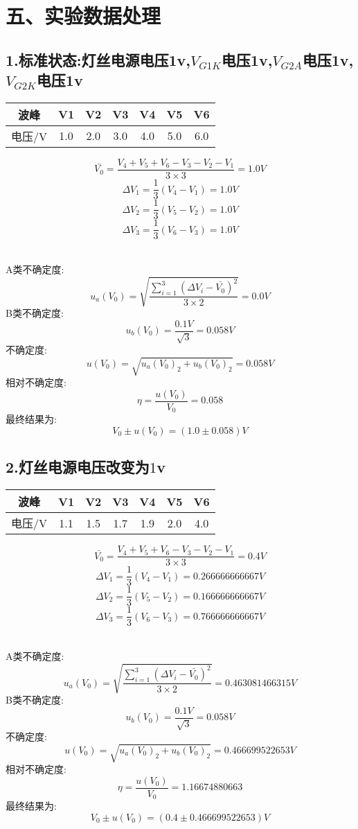 \documentclass[11pt,a4paper,oneside]{article}
\begin{document}
\section*{五、实验数据处理}
\subsection*{1.标准状态:灯丝电源电压1v,$V_{G1K}$电压1v,$V_{G2A}$电压1v,$V_{G2K}$电压1v}
\begin{center}
\begin{tabular}{|c|c|c|c|c|c|c|}
	\hline
	波峰&V1&V2&V3&V4&V5&V6
	\\\hline
	电压/V&1.0&2.0&3.0&4.0&5.0&6.0\\\hline
	\end{tabular}
	\end{center}

$$  \bar{V_0}=\frac{V_4+V_5+V_6-V_3-V_2-V_1}{3\times 3}=1.0V $$
$$	\Delta V_1=\frac{1}{3}(V_4-V_1)=1.0V $$
$$	\Delta V_2=\frac{1}{3}(V_5-V_2)=1.0V $$
$$	\Delta V_3=\frac{1}{3}(V_6-V_3)=1.0V $$ 

\ \\
A类不确定度:
$$	u_a(V_0)=\sqrt{\frac{\sum\limits_{i=1}^{3} (\Delta V_i-\bar{V_0})^2}{3\times 2}}=0.0V $$
B类不确定度:
$$	u_b(V_0)=\frac{0.1V}{\sqrt{3}}=0.058V $$
不确定度:
$$	u(V_0)=\sqrt{u_a(V_0)_2+u_b(V_0)_2}=0.058V $$
相对不确定度:
$$	\eta=\frac{u(V_0)}{V_0}=0.058 $$
最终结果为:
$$	V_0 \pm u(V_0) = (1.0 \pm 0.058)V $$


\subsection*{2.灯丝电源电压改变为$1$v}
\begin{center}
\begin{tabular}{|c|c|c|c|c|c|c|}
	\hline
	波峰&V1&V2&V3&V4&V5&V6
	\\\hline
	电压/V&1.1&1.5&1.7&1.9&2.0&4.0\\\hline
	\end{tabular}
	\end{center}

$$  \bar{V_0}=\frac{V_4+V_5+V_6-V_3-V_2-V_1}{3\times 3}=0.4V $$
$$	\Delta V_1=\frac{1}{3}(V_4-V_1)=0.266666666667V $$
$$	\Delta V_2=\frac{1}{3}(V_5-V_2)=0.166666666667V $$
$$	\Delta V_3=\frac{1}{3}(V_6-V_3)=0.766666666667V $$ 

\ \\
A类不确定度:
$$	u_a(V_0)=\sqrt{\frac{\sum\limits_{i=1}^{3} (\Delta V_i-\bar{V_0})^2}{3\times 2}}=0.463081466315V $$
B类不确定度:
$$	u_b(V_0)=\frac{0.1V}{\sqrt{3}}=0.058V $$
不确定度:
$$	u(V_0)=\sqrt{u_a(V_0)_2+u_b(V_0)_2}=0.466699522653V $$
相对不确定度:
$$	\eta=\frac{u(V_0)}{V_0}=1.16674880663 $$
最终结果为:
$$	V_0 \pm u(V_0) = (0.4 \pm 0.466699522653)V $$
\end{document}
